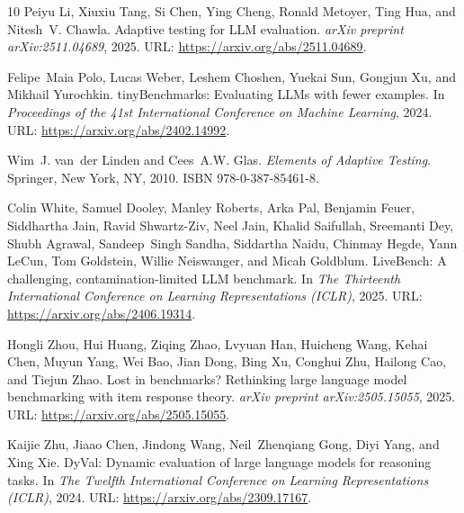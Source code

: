 \documentclass{article}
\begin{document}
\begin{thebibliography}{10}
Peiyu Li, Xiuxiu Tang, Si Chen, Ying Cheng, Ronald Metoyer, Ting Hua, and
  Nitesh~V. Chawla.
\newblock Adaptive testing for LLM evaluation.
\newblock \emph{arXiv preprint arXiv:2511.04689}, 2025.
\newblock URL: \url{https://arxiv.org/abs/2511.04689}.

Felipe~Maia Polo, Lucas Weber, Leshem Choshen, Yuekai Sun, Gongjun Xu, and
  Mikhail Yurochkin.
\newblock tinyBenchmarks: Evaluating LLMs with fewer examples.
\newblock In \emph{Proceedings of the 41st International Conference on Machine
  Learning}, 2024.
\newblock URL: \url{https://arxiv.org/abs/2402.14992}.

Wim~J. van~der Linden and Cees~A.W. Glas.
\newblock \emph{Elements of Adaptive Testing}.
\newblock Springer, New York, NY, 2010.
\newblock ISBN 978-0-387-85461-8.

Colin White, Samuel Dooley, Manley Roberts, Arka Pal, Benjamin Feuer, Siddhartha
  Jain, Ravid Shwartz-Ziv, Neel Jain, Khalid Saifullah, Sreemanti Dey,
  Shubh Agrawal, Sandeep~Singh Sandha, Siddartha Naidu, Chinmay Hegde, Yann
  LeCun, Tom Goldstein, Willie Neiswanger, and Micah Goldblum.
\newblock LiveBench: A challenging, contamination-limited LLM benchmark.
\newblock In \emph{The Thirteenth International Conference on Learning
  Representations (ICLR)}, 2025.
\newblock URL: \url{https://arxiv.org/abs/2406.19314}.

Hongli Zhou, Hui Huang, Ziqing Zhao, Lvyuan Han, Huicheng Wang, Kehai Chen,
  Muyun Yang, Wei Bao, Jian Dong, Bing Xu, Conghui Zhu, Hailong Cao, and
  Tiejun Zhao.
\newblock Lost in benchmarks? Rethinking large language model benchmarking with
  item response theory.
\newblock \emph{arXiv preprint arXiv:2505.15055}, 2025.
\newblock URL: \url{https://arxiv.org/abs/2505.15055}.

Kaijie Zhu, Jiaao Chen, Jindong Wang, Neil~Zhenqiang Gong, Diyi Yang, and Xing
  Xie.
\newblock DyVal: Dynamic evaluation of large language models for reasoning
  tasks.
\newblock In \emph{The Twelfth International Conference on Learning
  Representations (ICLR)}, 2024.
\newblock URL: \url{https://arxiv.org/abs/2309.17167}.

\end{thebibliography}
\end{document}
